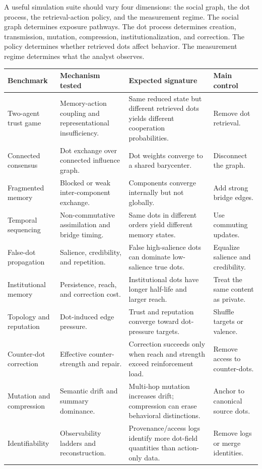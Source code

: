 \documentclass[11pt]{article}
\theoremstyle{remark}
\begin{document}
A useful simulation suite should vary four dimensions: the social graph, the dot process, the retrieval-action policy, and the measurement regime. The social graph determines exposure pathways. The dot process determines creation, transmission, mutation, compression, institutionalization, and correction. The policy determines whether retrieved dots affect behavior. The measurement regime determines what the analyst observes.

{\footnotesize
\begin{longtable}[]{@{}L{0.17\textwidth}L{0.31\textwidth}L{0.31\textwidth}L{0.14\textwidth}@{}}
\toprule
Benchmark & Mechanism tested & Expected signature & Main control\\
\midrule
\endhead
Two-agent trust game & Memory-action coupling and representational insufficiency. & Same reduced state but different retrieved dots yields different cooperation probabilities. & Remove dot retrieval.\\
Connected consensus & Dot exchange over connected influence graph. & Dot weights converge to a shared barycenter. & Disconnect the graph.\\
Fragmented memory & Blocked or weak inter-component exchange. & Components converge internally but not globally. & Add strong bridge edges.\\
Temporal sequencing & Non-commutative assimilation and bridge timing. & Same dots in different orders yield different memory states. & Use commuting updates.\\
False-dot propagation & Salience, credibility, and repetition. & False high-salience dots can dominate low-salience true dots. & Equalize salience and credibility.\\
Institutional memory & Persistence, reach, and correction cost. & Institutional dots have longer half-life and larger reach. & Treat the same content as private.\\
Topology and reputation & Dot-induced edge pressure. & Trust and reputation converge toward dot-pressure targets. & Shuffle targets or valence.\\
Counter-dot correction & Effective counter-strength and repair. & Correction succeeds only when reach and strength exceed reinforcement load. & Remove access to counter-dots.\\
Mutation and compression & Semantic drift and summary dominance. & Multi-hop mutation increases drift; compression can erase behavioral distinctions. & Anchor to canonical source dots.\\
Identifiability & Observability ladders and reconstruction. & Provenance/access logs identify more dot-field quantities than action-only data. & Remove logs or merge identities.\\

\end{longtable}}
\end{document}
